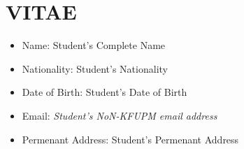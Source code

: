 

\newpage
{} %
\label{vitae}

\chapter*{\centering VITAE}


\begin{itemize}
  \item Name:					Student's Complete Name	   		
  \item Nationality:   			Student's Nationality	
  \item Date of Birth: 			Student's Date of Birth	
  \item Email:  		\emph{	Student's NoN-KFUPM email address  }
  \item Permenant Address:		Student's Permenant Address
  \newline
  \end{itemize}